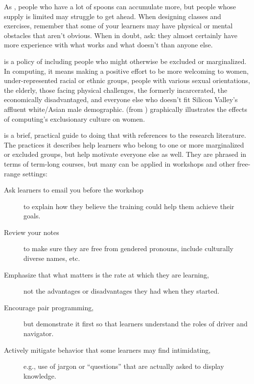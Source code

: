 As ,
people who have a lot of spoons can accumulate more,
but people whose supply is limited may struggle to get ahead.
When designing classes and exercises,
remember that some of your learners may have physical or mental obstacles that aren't obvious.
When in doubt, ask:
they almost certainly have more experience with what works and what doesn't than anyone else.


 is a policy of including people who might otherwise be excluded or marginalized.
In computing,
it means making a positive effort to be more welcoming to women,
under-represented racial or ethnic groups,
people with various sexual orientations,
the elderly,
those facing physical challenges,
the formerly incarcerated,
the economically disadvantaged,
and everyone else who doesn't fit Silicon Valley's affluent white/Asian male demographic.
 (from )
graphically illustrates the effects of computing's exclusionary culture on women.


\cite{Lee2017} is a brief, practical guide to doing that with references to the research literature.
The practices it describes help learners who belong to one or more marginalized or excluded groups,
but help motivate everyone else as well.
They are phrased in terms of term-long courses,
but many can be applied in workshops and other free-range settings:

\begin{description}

\item[Ask learners to email you before the workshop]
  to explain how they believe the training could help them achieve their goals.

\item[Review your notes]
  to make sure they are free from gendered pronouns, include culturally diverse names, etc.

\item[Emphasize that what matters is the rate at which they are learning,]
  not the advantages or disadvantages they had when they started.

\item[Encourage pair programming,]
  but demonstrate it first so that learners understand the roles of driver and navigator.

\item[Actively mitigate behavior that some learners may find intimidating,]
  e.g., use of jargon or ``questions'' that are actually asked to display knowledge.

\end{description}

